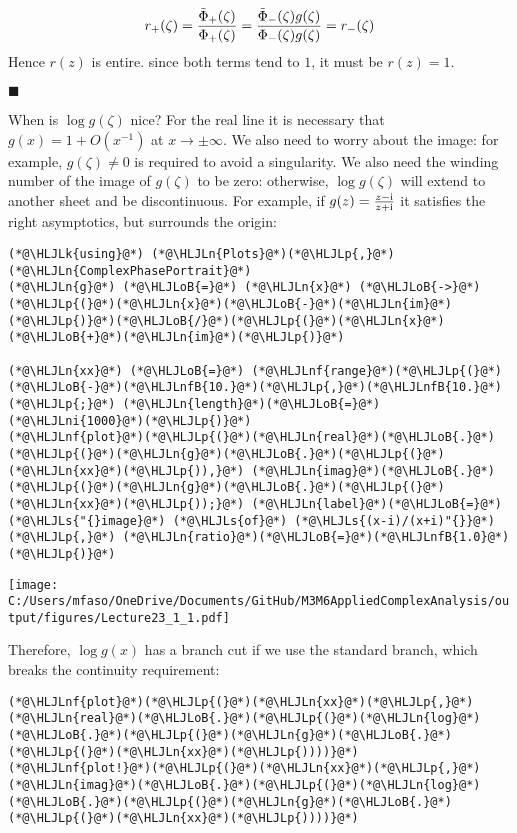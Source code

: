 \documentclass[12pt,a4paper]{article}
\newcommand{\HLJLk}[1]{\textcolor[RGB]{148,91,176}{\textbf{#1}}}
\newcommand{\HLJLn}[1]{#1}
\newcommand{\HLJLnf}[1]{\textcolor[RGB]{66,102,213}{#1}}
\newcommand{\HLJLs}[1]{\textcolor[RGB]{201,61,57}{#1}}
\newcommand{\HLJLnfB}[1]{\textcolor[RGB]{59,151,46}{#1}}
\newcommand{\HLJLni}[1]{\textcolor[RGB]{59,151,46}{#1}}
\newcommand{\HLJLoB}[1]{\textcolor[RGB]{102,102,102}{\textbf{#1}}}
\newcommand{\HLJLp}[1]{#1}
\def\I{ {\rm i} }
\begin{document}
\[
r_+(\zeta) = {\tilde\Phi_+(\zeta) \over \Phi_+(\zeta)} = {\tilde\Phi_-(\zeta) g(\zeta) \over \Phi_-(\zeta) g(\zeta)} = r_-(\zeta)
\]
Hence $r(z)$ is entire. since both terms tend to $1$, it must be $r(z) = 1$.

\ensuremath{\blacksquare}

When is $\log g(\zeta)$ nice? For the real line it is necessary that $g(x) = 1 + O(x^{-1})$ at $x \rightarrow \pm \infty$. We also need to worry about the image: for example, $g(\zeta) \neq 0$ is required to avoid a singularity.  We also need the winding number of the image of $g(\zeta)$ to be zero: otherwise, $\log g(\zeta)$ will extend to another sheet and be discontinuous.   For example, if $g(z) = {z-\I \over z+\I}$ it satisfies the right asymptotics, but surrounds the origin:


\begin{lstlisting}
(*@\HLJLk{using}@*) (*@\HLJLn{Plots}@*)(*@\HLJLp{,}@*) (*@\HLJLn{ComplexPhasePortrait}@*)
(*@\HLJLn{g}@*) (*@\HLJLoB{=}@*) (*@\HLJLn{x}@*) (*@\HLJLoB{->}@*) (*@\HLJLp{(}@*)(*@\HLJLn{x}@*)(*@\HLJLoB{-}@*)(*@\HLJLn{im}@*)(*@\HLJLp{)}@*)(*@\HLJLoB{/}@*)(*@\HLJLp{(}@*)(*@\HLJLn{x}@*)(*@\HLJLoB{+}@*)(*@\HLJLn{im}@*)(*@\HLJLp{)}@*)

(*@\HLJLn{xx}@*) (*@\HLJLoB{=}@*) (*@\HLJLnf{range}@*)(*@\HLJLp{(}@*)(*@\HLJLoB{-}@*)(*@\HLJLnfB{10.}@*)(*@\HLJLp{,}@*)(*@\HLJLnfB{10.}@*)(*@\HLJLp{;}@*) (*@\HLJLn{length}@*)(*@\HLJLoB{=}@*)(*@\HLJLni{1000}@*)(*@\HLJLp{)}@*)
(*@\HLJLnf{plot}@*)(*@\HLJLp{(}@*)(*@\HLJLn{real}@*)(*@\HLJLoB{.}@*)(*@\HLJLp{(}@*)(*@\HLJLn{g}@*)(*@\HLJLoB{.}@*)(*@\HLJLp{(}@*)(*@\HLJLn{xx}@*)(*@\HLJLp{)),}@*) (*@\HLJLn{imag}@*)(*@\HLJLoB{.}@*)(*@\HLJLp{(}@*)(*@\HLJLn{g}@*)(*@\HLJLoB{.}@*)(*@\HLJLp{(}@*)(*@\HLJLn{xx}@*)(*@\HLJLp{));}@*) (*@\HLJLn{label}@*)(*@\HLJLoB{=}@*)(*@\HLJLs{"{}image}@*) (*@\HLJLs{of}@*) (*@\HLJLs{(x-i)/(x+i)"{}}@*)(*@\HLJLp{,}@*) (*@\HLJLn{ratio}@*)(*@\HLJLoB{=}@*)(*@\HLJLnfB{1.0}@*)(*@\HLJLp{)}@*)
\end{lstlisting}

\texttt{[image: C:/Users/mfaso/OneDrive/Documents/GitHub/M3M6AppliedComplexAnalysis/output/figures/Lecture23\_1\_1.pdf]}

Therefore, $\log g(x)$ has a branch cut if we use the standard branch, which breaks the continuity requirement:


\begin{lstlisting}
(*@\HLJLnf{plot}@*)(*@\HLJLp{(}@*)(*@\HLJLn{xx}@*)(*@\HLJLp{,}@*) (*@\HLJLn{real}@*)(*@\HLJLoB{.}@*)(*@\HLJLp{(}@*)(*@\HLJLn{log}@*)(*@\HLJLoB{.}@*)(*@\HLJLp{(}@*)(*@\HLJLn{g}@*)(*@\HLJLoB{.}@*)(*@\HLJLp{(}@*)(*@\HLJLn{xx}@*)(*@\HLJLp{))))}@*)
(*@\HLJLnf{plot!}@*)(*@\HLJLp{(}@*)(*@\HLJLn{xx}@*)(*@\HLJLp{,}@*) (*@\HLJLn{imag}@*)(*@\HLJLoB{.}@*)(*@\HLJLp{(}@*)(*@\HLJLn{log}@*)(*@\HLJLoB{.}@*)(*@\HLJLp{(}@*)(*@\HLJLn{g}@*)(*@\HLJLoB{.}@*)(*@\HLJLp{(}@*)(*@\HLJLn{xx}@*)(*@\HLJLp{))))}@*)
\end{lstlisting}
\end{document}
